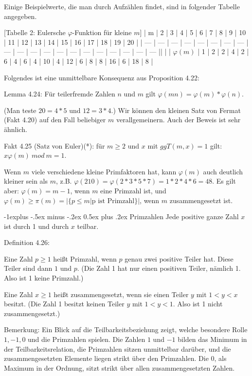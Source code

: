 \documentclass[a4paper]{article}
\makeatletter
\renewcommand{\subsection}{\@startsection{subsection}{2}{0mm}%
 {-1explus -.5ex minus -.2ex}%
 {0.5ex plus .2ex}%
 {\normalfont\normalsize\bfseries}}
\makeatother
\begin{document}
\begin{multicols}{3}
    Einige Beispielwerte, die man durch Aufzählen findet, sind in folgender Tabelle angegeben.

        [Tabelle 2: Eulersche $\varphi$-Funktion für kleine $m$]
    | m   | 2   | 3   | 4   | 5   | 6   | 7   | 8   | 9   | 10  | 11  | 12  | 13  | 14  | 15  | 16  | 17  | 18  | 19  | 20  |
    | --- | --- | --- | --- | --- | --- | --- | --- | --- | --- | --- | --- | --- | --- | --- | --- | --- | --- | --- | --- ||  |
    | $\varphi(m)$ | 1   | 2   | 2   | 4   | 2   | 6   | 4   | 6   | 4   | 10  | 4   | 12  | 6   | 8   | 8   | 16  | 6   | 18  | 8   |

    Folgendes ist eine unmittelbare Konsequenz aus Proposition 4.22:

    Lemma 4.24: Für teilerfremde Zahlen $n$ und $m$ gilt $\varphi(mn)=\varphi(m)*\varphi(n)$.

    (Man teste $20=4*5$ und $12=3*4$.)
    Wir können den kleinen Satz von Fermat (Fakt 4.20) auf den Fall beliebiger $m$ verallgemeinern. Auch der Beweis ist sehr ähnlich.

    Fakt 4.25 (Satz von Euler)(*): für $m\geq 2$ und $x$ mit $ggT(m,x) = 1$ gilt: $x\varphi(m)\ mod\ m=1$.

    Wenn $m$ viele verschiedene kleine Primfaktoren hat, kann $\varphi(m)$ auch deutlich kleiner sein als $m$, z.B. $\varphi(210) =\varphi(2*3*5*7)=1*2*4*6=48$. Es gilt aber: $\varphi(m) =m-1$, wenn $m$ eine Primzahl ist, und $\varphi(m)\geq \pi(m) =|\{p\leq m|\text{p ist Primzahl}\}|$, wenn $m$ zusammengesetzt ist.

    \subsection{Primzahlen}
    Jede positive ganze Zahl $x$ ist durch 1 und durch $x$ teilbar.

    Definition 4.26:
    \begin{enumerate*}
        \item Eine Zahl $p\geq 1$ heißt Primzahl, wenn $p$ genau zwei positive Teiler hat. Diese Teiler sind dann $1$ und $p$. (Die Zahl 1 hat nur einen positiven Teiler, nämlich 1. Also ist 1 keine Primzahl.)
        \item  Eine Zahl $x\geq 1$ heißt zusammengesetzt, wenn sie einen Teiler $y$ mit $1<y < x$ besitzt. (Die Zahl 1 besitzt keinen Teiler $y$ mit $1<y<1$. Also ist 1 nicht zusammengesetzt.)
    \end{enumerate*}

    Bemerkung: Ein Blick auf die Teilbarkeitsbeziehung zeigt, welche besondere Rolle $1,-1, 0$ und die Primzahlen spielen. Die Zahlen $1$ und $-1$ bilden das Minimum in der Teilbarkeitsrelation, die Primzahlen sitzen unmittelbar darüber, und die zusammengesetzten Elemente liegen strikt über den Primzahlen. Die $0$, als Maximum in der Ordnung, sitzt strikt über allen zusammengesetzten Zahlen.


\end{multicols}
\end{document}

